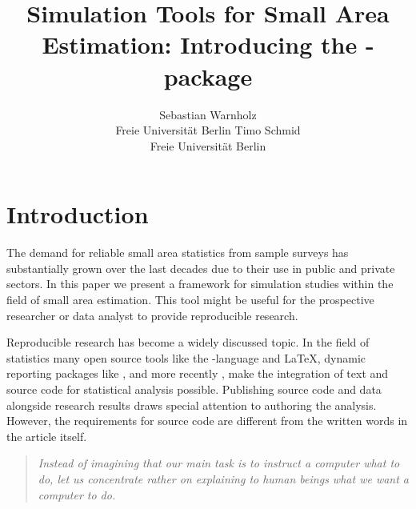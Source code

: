 \documentclass[article]{ajs}
\author{Sebastian Warnholz\\ Freie Universit\"at Berlin \And 
        Timo Schmid \\ Freie Universit\"at Berlin}
\title{Simulation Tools for Small Area Estimation: Introducing the \proglang{R}-package \proglang{saeSim}}
\begin{document}
%
%
%
\section{Introduction}
The demand for reliable small area statistics from sample surveys has substantially grown over the last decades due to their use in public and private sectors. In this paper we present a framework for simulation studies within the field of small area estimation. This tool might be useful for the prospective researcher or data analyst to provide reproducible research.

Reproducible research has become a widely discussed topic. In the field of statistics many open source tools like the -language \citep{r14} and \LaTeX, dynamic reporting packages like  \citep{yihui13},  \citep{leisch02} and more recently  \citep{allaire14}, make the integration of text and source code for statistical analysis possible. Publishing source code and data alongside research results draws special attention to authoring the analysis. However, the requirements for source code are different from the written words in the article itself. 

\begin{quote}
\textit{Instead of imagining that our main task is to instruct a computer what to do, let us concentrate rather on explaining to human beings what we want a computer to do.} \cite[p.99]{knuth92} 
\end{quote} 
\end{document}
